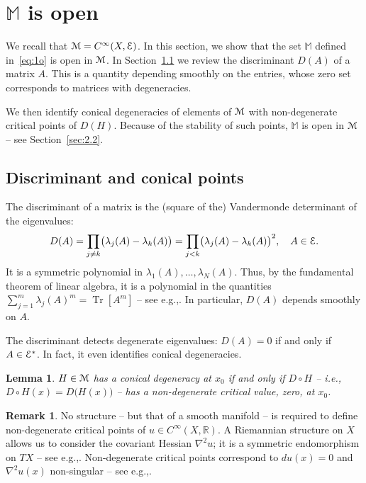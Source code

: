\documentclass[11pt]{article}
\newcommand{\ie}{i.e.,\xspace}
\newcommand{\eg}{e.g.,\xspace}
\numberwithin{equation}{section}
\let\pazocal\EuScript
\newtheorem{lem}{Lemma}[section]
\theoremstyle{definition}
\newtheorem{rmk}{Remark}[section]
\DeclareMathOperator{\Tr}{Tr}
\newcommand{\EE}{\pazocal{E}}
\newcommand{\MM}{\pazocal{M}}
\newcommand{\R}{\mathbb{R}}
\newcommand{\Mm}{\mathbb{M}}
\begin{document}
\section{\texorpdfstring{$\Mm$}{M} is open}\label{sec:2}

We recall that $\MM = C^\infty(X,\EE)$. In this section, we show that the set $\Mm$ defined in~\eqref{eq:1o} is open in $\MM$. In Section~\ref{sec:2.1} we review the discriminant $D(A)$ of a matrix $A$. This is a quantity depending smoothly on the entries, whose zero set corresponds to matrices with degeneracies.

We then identify conical degeneracies of elements of $\MM$ with non-degenerate critical points of $D(H)$. Because of the stability of such points, $\Mm$ is open in $\MM$ -- see Section~\ref{sec:2.2}.

\subsection{Discriminant and conical points}\label{sec:2.1} The discriminant of a matrix is the (square of the) Vandermonde determinant of the eigenvalues:
\begin{equation}\label{eq:1h}
D(A) = \prod_{j \neq k} \bigl(\lambda_j(A)-\lambda_k(A)\bigr) = \prod_{j < k} \bigl(\lambda_j(A)-\lambda_k(A)\bigr)^2, \quad A\in \EE.
\end{equation}
It is a symmetric polynomial in $\lambda_1(A), \dots, \lambda_N(A)$. Thus, by the fundamental theorem of linear algebra, it is a polynomial in the quantities $\sum_{j=1}^m \lambda_j(A)^m = \Tr[A^m]$ -- see \eg \cite[\S I.2]{M95}. In particular, $D(A)$ depends smoothly on $A$.

The discriminant detects degenerate eigenvalues: $D(A) = 0$ if and only if $A \in \EE^*$. In fact, it even identifies conical degeneracies.

\begin{lem}\label{lem:1a} $H \in \MM$ has a conical degeneracy at $x_0$ if and only if $D \circ H$ -- \ie $D \circ H(x) = D\bigl( H(x) \bigr)$ -- has a non-degenerate critical value, zero, at $x_0$.
\end{lem}

\begin{rmk}\label{rem:2} No structure -- but that of a smooth manifold -- is required to define non-degenerate critical points of $u \in C^\infty(X,\R)$. A Riemannian structure on $X$ allows us to consider the covariant Hessian $\nabla^2 u$; it is a symmetric endomorphism on $TX$ -- see \eg \cite[\S2.1]{P06}. Non-degenerate critical points correspond to $du(x) = 0$ and $\nabla^2u(x)$ non-singular -- see \eg \cite[\S5.12]{P06}.
\end{rmk}
\end{document}
